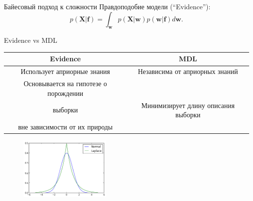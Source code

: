 \documentclass[10pt,pdf,utf8,russian,aspectratio=169]{beamer}
\begin{document}
\begin{frame}{Байесовый подход к сложности}
Правдоподобие модели (``Evidence''):
\[
	p(\mathbf{X}|\mathbf{f}) = \int_\mathbf{w} p(\mathbf{X}|\mathbf{w})p(\mathbf{w}|\mathbf{f}) d\mathbf{w}.
\]


\begin{figure}
  \centering
\label{fig:1}\qquad

\end{figure}


\end{frame}

\begin{frame}{Evidence vs MDL}
\begin{tabular}{ c | c  }
  \hline			
 \bf Evidence & \bf MDL \\
  \hline  
Использует априорные знания &  Независима от априорных знаний \\
  \hline  
Основывается на гипотезе о порождении\\ выборки & Минимизирует длину описания выборки\\ вне зависимости от их природы \\
  \hline  

\end{tabular}


\begin{figure}
  \centering
 \includegraphics[width=0.4\textwidth]{laplace.png}
\label{fig:1}\qquad

\end{figure}
\end{frame}
\end{document}
